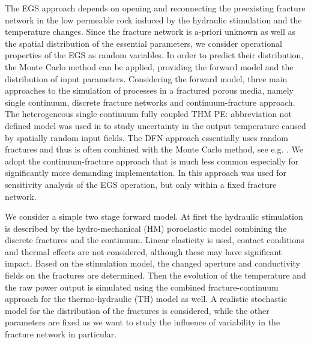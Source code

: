 \documentclass{article}
\newcommand{\todo}[1]{{\color{red}#1}}
\begin{document}
The EGS approach depends on opening and reconnecting the preexisting fracture network in the low permeable rock induced by
the hydraulic stimulation and the temperature changes. Since the fracture network is a-priori unknown as well as the spatial
distribution of the essential parameters, we consider operational properties of the EGS as random variables. In order to predict their
distribution, the Monte Carlo method can be applied, providing the forward model and the distribution of input parameters.
Considering the forward model, three main approaches to the simulation of processes in a fractured porous media, namely single
continuum, discrete fracture networks and continuum-fracture approach. The heterogeneous single continuum fully coupled THM \todo{PE: abbreviation not defined}
model was used in \cite{Watanabe2009} to study uncertainty in the output temperature caused by spatially random input fields.
The DFN approach essentially uses random fractures and thus is often combined with the Monte Carlo method, see e.g. \cite{ezzedine2008}. We adopt the continuum-fracture approach that is much less common especially for significantly more demanding
implementation. In \cite{Doonechaly2016} this approach was used for sensitivity analysis of the EGS operation, but
only within a fixed fracture network.

We consider a simple two stage forward model. At first the hydraulic stimulation is described by the hydro-mechanical (HM)
poroelastic model combining the discrete fractures and the continuum. Linear elasticity is used, contact conditions and thermal effects
are not considered, although these may have significant impact. Based on the stimulation model, the changed aperture and
conductivity fields on the fractures are determined. Then the evolution of the temperature and the raw power output is simulated
using the combined fracture-continuum approach for the thermo-hydraulic (TH) model as well. A realistic stochastic model for the
distribution of the fractures is considered, while the other parameters are fixed as we want to study the influence of variability in the
fracture network in particular.
\end{document}
